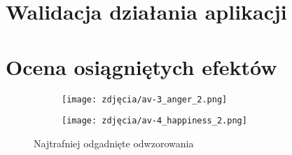 \section{Walidacja działania aplikacji}
\section{Ocena osiągniętych efektów}

\begin{figure}[h]
	\centering
	\begin{subfigure}{0.35\textwidth}
		\centering
		\texttt{[image: zdjęcia/av-3\_anger\_2.png]}
		\subcaption{\label{av-3_anger_2}}
	\end{subfigure}
	\begin{subfigure}{0.35\textwidth}
		\centering
		\texttt{[image: zdjęcia/av-4\_happiness\_2.png]}
		\subcaption{\label{av-4_happiness_2}}
	\end{subfigure}
	
	\caption{\label{fig:best_results}Najtrafniej odgadnięte odwzorowania}
\end{figure}


